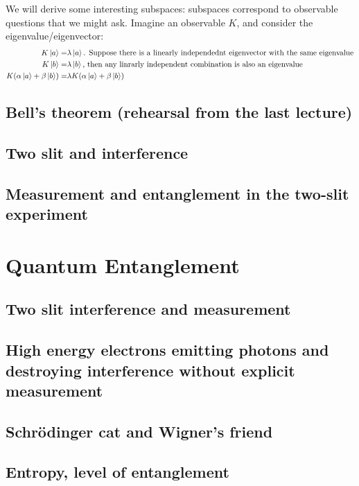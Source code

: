 \documentclass[]{article}
\begin{document}
We will derive some interesting subspaces: subspaces correspond to observable questions that we might ask. Imagine an observable $K$, and consider the eigenvalue/eigenvector:
\begin{align*}
	K \ket{a} =& \lambda \ket{a} \text{. Suppose there is a linearly independednt eigenvector with the same eigenvalue}\\
	K \ket{b} =& \lambda \ket{b} \text{, then any linrarly independent combination is also an eigenvalue}\\
	K(\alpha \ket{a} + \beta \ket{b}) =& \lambda K(\alpha \ket{a} + \beta \ket{b})
\end{align*}
\subsection{Bell's theorem (rehearsal from the last lecture)}

\subsection{Two slit and interference} 

\subsection{Measurement and entanglement in the two-slit experiment}

\section{Quantum Entanglement}

\subsection{Two slit interference and measurement} 

\subsection{High energy electrons emitting photons and destroying interference without explicit measurement} 

\subsection{Schr\"odinger cat and Wigner's friend} 

 \subsection{Entropy, level of entanglement}  
 
\end{document}
